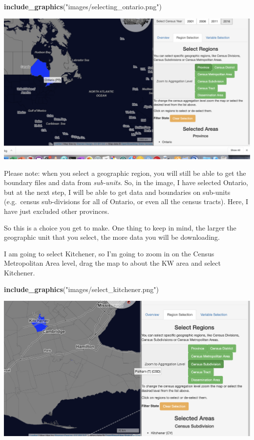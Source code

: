 \documentclass[
]{article}
\newenvironment{Shaded}{\begin{snugshade}}{\end{snugshade}}
\newcommand{\KeywordTok}[1]{\textcolor[rgb]{0.13,0.29,0.53}{\textbf{#1}}}
\newcommand{\NormalTok}[1]{#1}
\newcommand{\StringTok}[1]{\textcolor[rgb]{0.31,0.60,0.02}{#1}}
\begin{document}
\begin{Shaded}
\begin{Highlighting}[]
\KeywordTok{include\_graphics}\NormalTok{(}\StringTok{"images/selecting\_ontario.png"}\NormalTok{)}
\end{Highlighting}
\end{Shaded}

\begin{center}\includegraphics[width=0.5\linewidth]{images/selecting_ontario} \end{center}

Please note: when you select a geographic region, you will still be able
to get the boundary files and data from \emph{sub-units}. So, in the
image, I have selected Ontario, but at the next step, I will be able to
get data and boundaries on sub-units (e.g.~census sub-divisions for all
of Ontario, or even all the census tracts). Here, I have just excluded
other provinces.

So this is a choice you get to make. One thing to keep in mind, the
larger the geographic unit that you select, the more data you will be
downloading.

I am going to select Kitchener, so I'm going to zoom in on the Census
Metropolitan Area level, drag the map to about the KW area and select
Kitchener.

\begin{Shaded}
\begin{Highlighting}[]
\KeywordTok{include\_graphics}\NormalTok{(}\StringTok{"images/select\_kitchener.png"}\NormalTok{)}
\end{Highlighting}
\end{Shaded}

\begin{center}\includegraphics[width=0.5\linewidth]{images/select_kitchener} \end{center}
\end{document}
